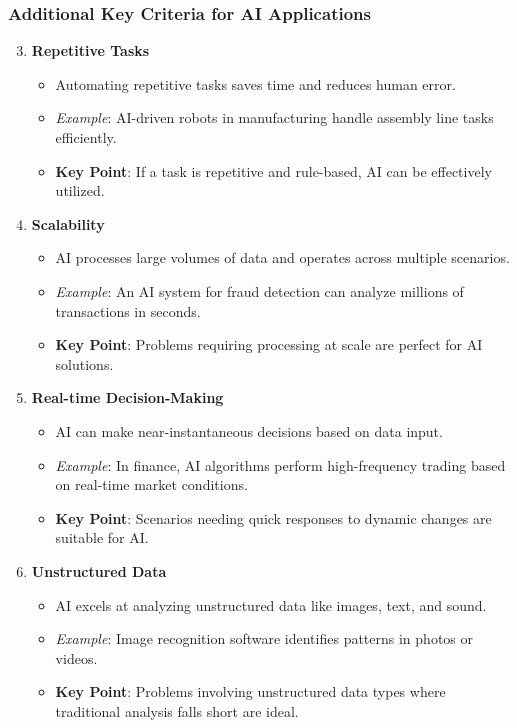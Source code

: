 \documentclass{beamer}
\begin{document}
\begin{frame}[fragile]
    \frametitle{Additional Key Criteria for AI Applications}
    \begin{enumerate}
        \setcounter{enumi}{2}
        \item \textbf{Repetitive Tasks}
            \begin{itemize}
                \item Automating repetitive tasks saves time and reduces human error.
                \item \textit{Example}: AI-driven robots in manufacturing handle assembly line tasks efficiently.
                \item \textbf{Key Point}: If a task is repetitive and rule-based, AI can be effectively utilized.
            \end{itemize}
        \item \textbf{Scalability}
            \begin{itemize}
                \item AI processes large volumes of data and operates across multiple scenarios.
                \item \textit{Example}: An AI system for fraud detection can analyze millions of transactions in seconds.
                \item \textbf{Key Point}: Problems requiring processing at scale are perfect for AI solutions.
            \end{itemize}
        \item \textbf{Real-time Decision-Making}
            \begin{itemize}
                \item AI can make near-instantaneous decisions based on data input.
                \item \textit{Example}: In finance, AI algorithms perform high-frequency trading based on real-time market conditions.
                \item \textbf{Key Point}: Scenarios needing quick responses to dynamic changes are suitable for AI.
            \end{itemize}
        \item \textbf{Unstructured Data}
            \begin{itemize}
                \item AI excels at analyzing unstructured data like images, text, and sound.
                \item \textit{Example}: Image recognition software identifies patterns in photos or videos.
                \item \textbf{Key Point}: Problems involving unstructured data types where traditional analysis falls short are ideal.
            \end{itemize}
    \end{enumerate}
\end{frame}
\end{document}
